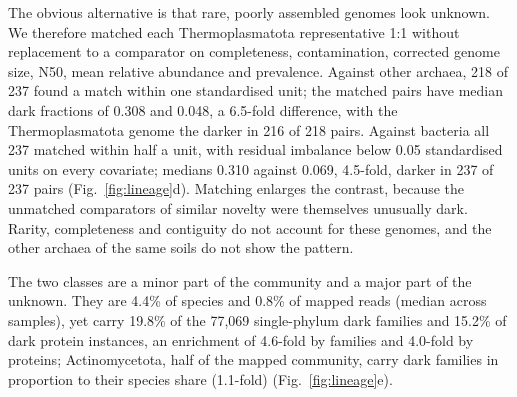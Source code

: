 \documentclass[11pt]{article}
\begin{document}
The obvious alternative is that rare, poorly assembled genomes look unknown. We therefore matched
each Thermoplasmatota representative 1:1 without replacement to a comparator on completeness,
contamination, corrected genome size, N50, mean relative abundance and prevalence. Against other
archaea, 218 of 237 found a match within one standardised unit; the matched pairs have median dark
fractions of 0.308 and 0.048, a 6.5-fold difference, with the Thermoplasmatota genome the darker in
216 of 218 pairs. Against bacteria all 237 matched within half a unit, with residual imbalance below
0.05 standardised units on every covariate; medians 0.310 against 0.069, 4.5-fold, darker in 237 of
237 pairs (Fig.~\ref{fig:lineage}d). Matching enlarges the contrast, because the unmatched
comparators of similar novelty were themselves unusually dark. Rarity, completeness and contiguity
do not account for these genomes, and the other archaea of the same soils do not show the pattern.

The two classes are a minor part of the community and a major part of the unknown. They are 4.4\%
of species and 0.8\% of mapped reads (median across samples), yet carry 19.8\% of the 77{,}069
single-phylum dark families and 15.2\% of dark protein instances, an enrichment of 4.6-fold by
families and 4.0-fold by proteins; Actinomycetota, half of the mapped community, carry dark families
in proportion to their species share (1.1-fold) (Fig.~\ref{fig:lineage}e).
\end{document}
